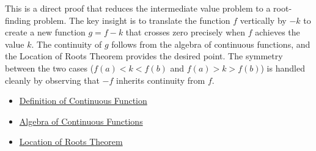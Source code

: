 \begin{remark*}
This is a direct proof that reduces the intermediate value problem to a root-finding problem. The key insight is to translate the function $f$ vertically by $-k$ to create a new function $g = f - k$ that crosses zero precisely when $f$ achieves the value $k$. The continuity of $g$ follows from the algebra of continuous functions, and the Location of Roots Theorem provides the desired point. The symmetry between the two cases ($f(a) < k < f(b)$ and $f(a) > k > f(b)$) is handled cleanly by observing that $-f$ inherits continuity from $f$.
\end{remark*}

\begin{dependencies}
\begin{itemize}
  \item \hyperref[def:continuous-function]{Definition of Continuous Function}
  \item \hyperref[thm:algebra-continuous-functions]{Algebra of Continuous Functions}
  \item \hyperref[thm:location-of-roots]{Location of Roots Theorem}
\end{itemize}
\end{dependencies}

\clearpage
